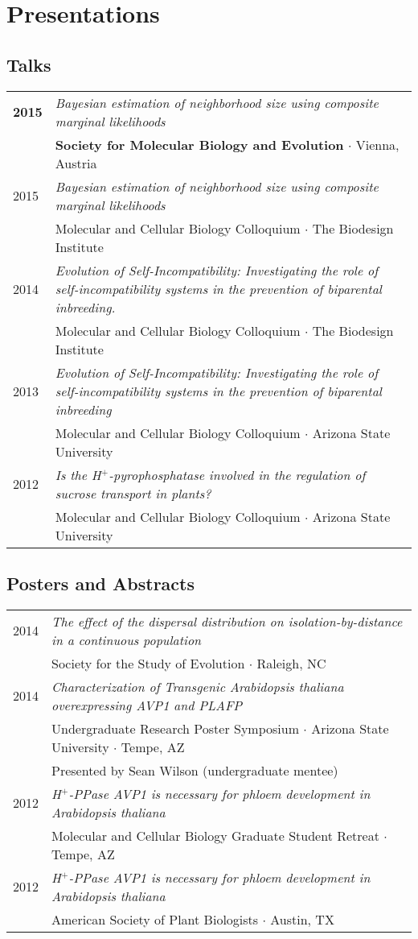 \documentclass[11pt]{article}
\begin{document}
\section*{Presentations}
\subsection*{Talks}
\renewcommand{\arraystretch}{1}
\begin{tabularx}{\linewidth}{l X}
\textbf{2015}&\textit{Bayesian estimation of neighborhood size using composite marginal likelihoods}\\
&\textbf{Society for Molecular Biology and Evolution} $\cdotp$ Vienna, Austria\\
2015&\textit{Bayesian estimation of neighborhood size using composite marginal likelihoods}\\
&Molecular and Cellular Biology Colloquium $\cdot$ The Biodesign Institute\\
2014&\textit{Evolution of Self-Incompatibility: Investigating the role of self-incompatibility systems in the prevention of biparental inbreeding.}\\
&Molecular and Cellular Biology Colloquium $\cdotp$ The Biodesign Institute\\
2013&\textit{Evolution of Self-Incompatibility: Investigating the role of self-incompatibility systems in the prevention of biparental inbreeding}\\
&Molecular and Cellular Biology Colloquium $\cdotp$ Arizona State University\\
2012&\textit{Is the H$^+$-pyrophosphatase involved in the regulation of sucrose transport in plants?}\\
&Molecular and Cellular Biology Colloquium $\cdotp$ Arizona State University\\
\end{tabularx}
\subsection*{Posters and Abstracts}
\begin{tabularx}{\linewidth}{l X}
2014&\textit{The effect of the dispersal distribution on isolation-by-distance in a continuous population}\\
&Society for the Study of Evolution $\cdotp$ Raleigh, NC\\
2014&\textit{Characterization of Transgenic Arabidopsis thaliana overexpressing AVP1 and PLAFP}\\
&Undergraduate Research Poster Symposium $\cdotp$ Arizona State University $\cdotp$ Tempe, AZ\\
&Presented by Sean Wilson (undergraduate mentee)\\
2012&\textit{H$^+$-PPase AVP1 is necessary for phloem development in Arabidopsis thaliana}\\
&Molecular and Cellular Biology Graduate Student Retreat $\cdotp$ Tempe, AZ\\
2012&\textit{H$^+$-PPase AVP1 is necessary for phloem development in Arabidopsis thaliana}\\
&American Society of Plant Biologists $\cdotp$ Austin, TX\\
\end{tabularx}
\end{document}
